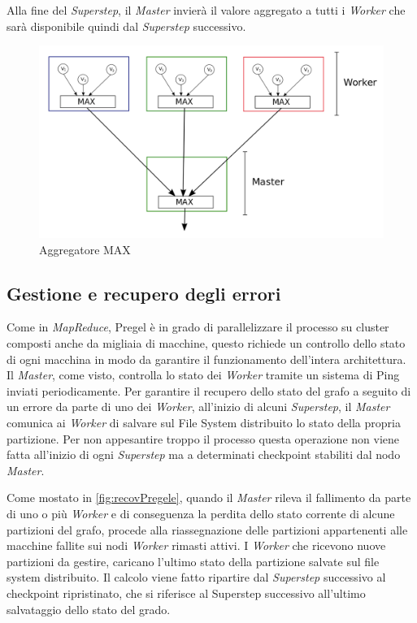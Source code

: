 \documentclass[LaM,binding=0.6cm]{sapthesis}
\begin{document}
Alla fine del \textit{Superstep}, il \textit{Master} invierà il valore aggregato a tutti i \textit{Worker} che sarà disponibile quindi dal \textit{Superstep} successivo.


\begin{figure}
\centering
\includegraphics[width=1\textwidth]{disegno_pregel_aggregartori}
\caption{Aggregatore MAX}
\label{fig:aggPregele}
\end{figure}

\subsection{Gestione e recupero degli errori}
Come in \textit{MapReduce}, Pregel è in grado di parallelizzare il processo su cluster composti anche da migliaia di macchine, questo richiede un controllo dello stato di ogni macchina in modo da garantire il funzionamento dell'intera architettura. Il \textit{Master}, come visto, controlla lo stato dei \textit{Worker} tramite un sistema di Ping inviati periodicamente.
Per garantire il recupero dello stato del grafo a seguito di un errore da parte di uno dei \textit{Worker}, all'inizio di alcuni \textit{Superstep}, il \textit{Master }comunica ai \textit{Worker} di salvare sul File System distribuito lo stato della propria partizione. Per non appesantire troppo il processo questa operazione non viene fatta all'inizio di ogni \textit{Superstep} ma a determinati checkpoint stabiliti dal nodo \textit{Master}.

Come mostato in \ref{fig:recovPregele}, quando il \textit{Master} rileva il fallimento da parte di uno o più \textit{Worker} e di conseguenza la perdita dello stato corrente di alcune partizioni del grafo, procede alla riassegnazione delle partizioni appartenenti alle macchine fallite sui nodi \textit{Worker} rimasti attivi.
I \textit{Worker} che ricevono nuove partizioni da gestire, caricano l'ultimo stato della partizione salvate sul file system distribuito.
Il calcolo viene fatto ripartire dal \textit{Superstep} successivo al checkpoint ripristinato, che si riferisce al Superstep successivo all'ultimo salvataggio dello stato del grado.
\end{document}
